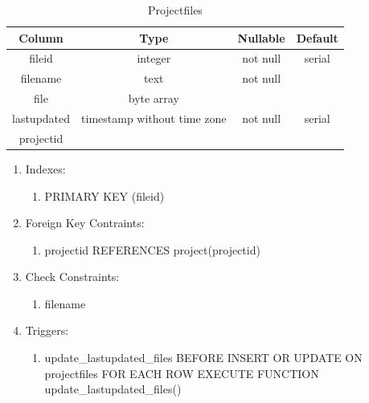 \documentclass[conference,onecolumn]{IEEEtran}
\begin{document}
\begin{table}[htbp]
  \caption{Projectfiles}
  \begin{center}
    \begin{tabular}{|c|c|c|c|}
      \hline
      \textbf{Column} & \textbf{Type} & \textbf{Nullable} & \textbf{Default}\\
      \hline
      fileid & integer & not null & serial\\
      filename & text & not null &\\
      file & byte array &&\\
      lastupdated & timestamp without time zone & not null & serial\\
      projectid &&&\\
      \hline
    \end{tabular}
    \begin{enumerate}
    \item Indexes:
      \begin{enumerate}
      \item PRIMARY KEY (fileid)
      \end{enumerate}
    \item Foreign Key Contraints:
      \begin{enumerate}
        \item projectid REFERENCES project(projectid)
      \end{enumerate}
    \item Check Constraints:
      \begin{enumerate}
      \item filename
      \end{enumerate}
    \item Triggers:
      \begin{enumerate}
        \item update\_lastupdated\_files BEFORE INSERT OR UPDATE ON projectfiles FOR EACH ROW EXECUTE FUNCTION update\_lastupdated\_files()
      \end{enumerate}
    \end{enumerate}
    \label{projectfiles}
  \end{center}
\end{table}
\end{document}
